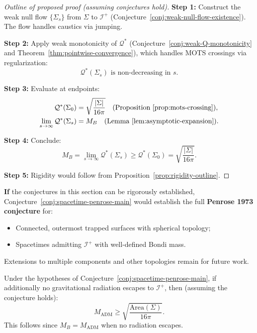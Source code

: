 \begin{proof}[Outline of proposed proof (assuming conjectures hold)]
\textbf{Step 1:} Construct the weak null flow $\{\Sigma_s\}$ from $\Sigma$ to $\mathscr{I}^+$ (Conjecture~\ref{conj:weak-null-flow-existence}). The flow handles caustics via jumping.

\textbf{Step 2:} Apply weak monotonicity of $\mathcal{Q}^*$ (Conjecture~\ref{conj:weak-Q-monotonicity} and Theorem~\ref{thm:pointwise-convergence}), which handles MOTS crossings via regularization:
\begin{equation}
\mathcal{Q}^*(\Sigma_s) \text{ is non-decreasing in } s.
\end{equation}

\textbf{Step 3:} Evaluate at endpoints:
\begin{align}
\mathcal{Q}^*(\Sigma_0) &= \sqrt{\frac{|\Sigma|}{16\pi}} \quad \text{(Proposition~\ref{prop:mots-crossing})}, \\
\lim_{s \to \infty} \mathcal{Q}^*(\Sigma_s) &= M_B \quad \text{(Lemma~\ref{lem:asymptotic-expansion})}.
\end{align}

\textbf{Step 4:} Conclude:
\begin{equation}
M_B = \lim_{s \to \infty} \mathcal{Q}^*(\Sigma_s) \geq \mathcal{Q}^*(\Sigma_0) = \sqrt{\frac{|\Sigma|}{16\pi}}.
\end{equation}

\textbf{Step 5:} Rigidity would follow from Proposition~\ref{prop:rigidity-outline}.
\end{proof}

\begin{remark}
\textbf{If} the conjectures in this section can be rigorously established, Conjecture~\ref{conj:spacetime-penrose-main} would establish the full \textbf{Penrose 1973 conjecture} for:
\begin{itemize}
\item Connected, outermost trapped surfaces with spherical topology;
\item Spacetimes admitting $\mathscr{I}^+$ with well-defined Bondi mass.
\end{itemize}
Extensions to multiple components and other topologies remain for future work.
\end{remark}

\begin{remark}
\label{rem:adm-version-conditional}
Under the hypotheses of Conjecture~\ref{conj:spacetime-penrose-main}, if additionally no gravitational radiation escapes to $\mathscr{I}^+$, then (assuming the conjecture holds):
\begin{equation}
M_{\mathrm{ADM}} \geq \sqrt{\frac{\mathrm{Area}(\Sigma)}{16\pi}}.
\end{equation}
This follows since $M_B = M_{\mathrm{ADM}}$ when no radiation escapes.
\end{remark}

